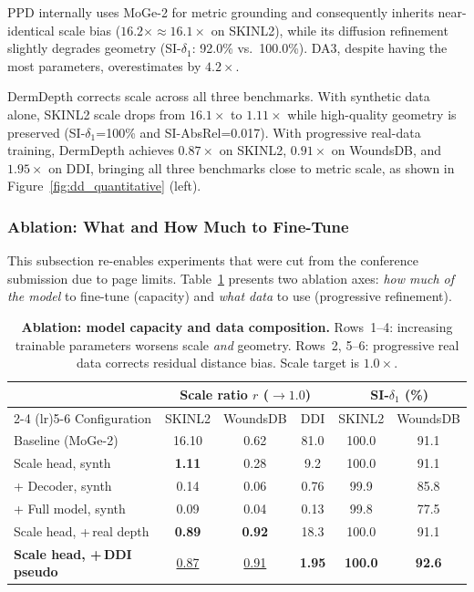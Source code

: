 \documentclass[11pt]{ucthesis}
\begin{document}
PPD internally uses MoGe-2 for metric grounding and consequently inherits near-identical scale bias ($16.2\times \approx 16.1\times$ on SKINL2), while its diffusion refinement slightly degrades geometry (SI-$\delta_1$: 92.0\% vs.\ 100.0\%). DA3, despite having the most parameters, overestimates by $4.2\times$.

DermDepth corrects scale across all three benchmarks. With synthetic data alone, SKINL2 scale drops from $16.1\times$ to $1.11\times$ while high-quality geometry is preserved (SI-$\delta_1${=}100\% and SI-AbsRel{=}0.017). With progressive real-data training, DermDepth achieves $0.87\times$ on SKINL2, $0.91\times$ on WoundsDB, and $1.95\times$ on DDI, bringing all three benchmarks close to metric scale, as shown in Figure~\ref{fig:dd_quantitative} (left).

\subsubsection{Ablation: What and How Much to Fine-Tune}\label{sec:dd_ablation}

This subsection re-enables experiments that were cut from the conference submission due to page limits. Table~\ref{tab:dd_ablation} presents two ablation axes: \emph{how much of the model} to fine-tune (capacity) and \emph{what data} to use (progressive refinement).

\begin{table}[t]
\centering
\caption{\textbf{Ablation: model capacity and data composition.} Rows~1--4: increasing trainable parameters worsens scale \emph{and} geometry. Rows~2, 5--6: progressive real data corrects residual distance bias. Scale target is $1.0\times$.}
\label{tab:dd_ablation}
\small
\setlength\tabcolsep{4pt}
\begin{tabular}{@{}l ccc cc@{}}
\toprule
 & \multicolumn{3}{c}{Scale ratio $r$ ($\to 1.0$)} & \multicolumn{2}{c}{SI-$\delta_1$ (\%)} \\
\cmidrule(lr){2-4} \cmidrule(lr){5-6}
Configuration & SKINL2 & WoundsDB & DDI & SKINL2 & WoundsDB \\
\midrule
Baseline (MoGe-2)                 & 16.10 & 0.62 & 81.0 & 100.0 & 91.1 \\
\rowcolor{green!6}
Scale head, synth                  & \textbf{1.11}  & 0.28 &  9.2 & 100.0 & 91.1 \\
+ Decoder, synth                   & 0.14  & 0.06 & 0.76 &  99.9 & 85.8 \\
+ Full model, synth                & 0.09  & 0.04 & 0.13 &  99.8 & 77.5 \\
\midrule
Scale head, +\,real depth          & \textbf{0.89}  & \textbf{0.92} & 18.3 & 100.0 & 91.1 \\
\rowcolor{green!6}
\textbf{Scale head, +\,DDI pseudo} & \underline{0.87}  & \underline{0.91} & \textbf{1.95} & \textbf{100.0} & \textbf{92.6} \\
\bottomrule
\end{tabular}
\end{table}
\end{document}
